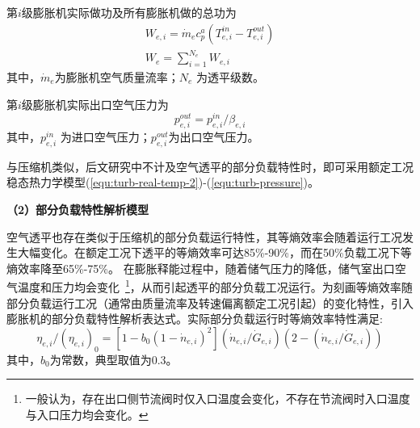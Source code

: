 第$i$级膨胀机实际做功及所有膨胀机做的总功为
\begin{subequations}
\label{equ:turb-power-all}
\begin{gather}
{W_{e,i}} = {\dot m_e}c_p^a({T_{e,i}^{in} - T_{e,i}^{out}})\label{equ:turb-power}\\
{W_e} = \sum\limits_{i = 1}^{{N_e}} {{W_{e,i}}}\label{equ:turb-power-total}
\end{gather}
\end{subequations}
其中，$\dot m_e$为膨胀机空气质量流率；$N_e$ 为透平级数。

第$i$级膨胀机实际出口空气压力为
\begin{equation}
\label{equ:turb-pressure}
p_{e,i}^{out} = p_{e,i}^{in}/{\beta _{e,i}}
\end{equation}
其中，$p_{e,i}^{in}$ 为进口空气压力；$p_{e,i}^{out}$为出口空气压力。

与压缩机类似，后文研究中不计及空气透平的部分负载特性时，即可采用额定工况稳态热力学模型(\ref{equ:turb-real-temp-2})-(\ref{equ:turb-pressure})。

\textbf{（2）部分负载特性解析模型}

空气透平也存在类似于压缩机的部分负载运行特性，其等熵效率会随着运行工况发生大幅变化。在额定工况下透平的等熵效率可达85\%-90\%，而在50\%负载工况下等熵效率降至65\%-75\%\cite{CAES-Review-18-Rui-operation,CAES-Discharge-16}。 在膨胀释能过程中，随着储气压力的降低，储气室出口空气温度和压力均会变化~\footnote{一般认为，存在出口侧节流阀时仅入口温度会变化，不存在节流阀时入口温度与入口压力均会变化。}，从而引起透平的部分负载工况运行。为刻画等熵效率随部分负载运行工况（通常由质量流率及转速偏离额定工况引起）的变化特性，引入膨胀机的部分负载特性解析表达式。实际部分负载运行时等熵效率特性满足\cite{Compressor-thermo-02, AA-CAES-Simulation-19}:
\begin{equation}
\label{equ:turb-eff-part}
{\eta _{e,i}}/{({{\eta _{e,i}}})_0} = [{1 - {b_0}{{({1 - {{\dot n}_{e,i}}})}^2}}]({{{\dot n}_{e,i}}/{{\dot G}_{e,i}}})({2 -({{{\dot n}_{e,i}}/{{\dot G}_{e,i}}})})
\end{equation}
其中，$b_0$为常数，典型取值为0.3\cite{Compressor-thermo-02}。

